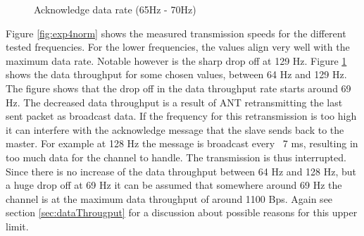 \begin{description}
\begin{figure}[H]
		\caption{Acknowledge data rate (65Hz - 70Hz)}\label{fig:exp4between}
	\end{figure}
	
	Figure \ref{fig:exp4norm} shows the measured transmission speeds for the different tested frequencies. For the lower frequencies, the values align very well with the maximum data rate. Notable however is the sharp drop off at 129 Hz. Figure \ref{fig:exp4between} shows the data throughput for some chosen values, between 64 Hz and 129 Hz. The figure shows that the drop off in the data throughput rate starts around 69 Hz. 
	The decreased data throughput is a result of ANT retransmitting the last sent packet as broadcast data. If the frequency for this retransmission is too high it can interfere with the acknowledge message that the slave sends back to the master. For example at 128 Hz the message is broadcast every ~7 ms, resulting in too much data for the channel to handle. The transmission is thus interrupted. 
	Since there is no increase of the data throughput between 64 Hz and 128 Hz, but a huge drop off at 69 Hz it can be assumed that somewhere around 69 Hz the channel is at the maximum data throughput of around 1100 Bps. Again see section \ref{sec:dataThrougput} for a discussion about possible reasons for this upper limit. 	
\end{description}
\newpage

